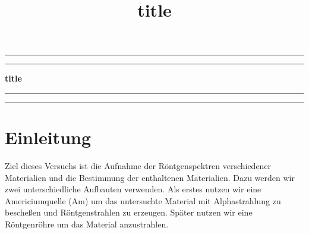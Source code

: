 \documentclass[a4paper,14pt]{article}
\title{\LARGE title}
\date{}
\newcommand{\Thickline}{\rule{\linewidth}{0.4mm}}
\newcommand{\Thinline}{\rule{\linewidth}{0.1mm}}
\newcommand{\skippage}{\clearpage{\thispagestyle{empty}\cleardoublepage}}
\begin{document}
	
\begin{titlepage}
	\thispagestyle{empty}
	
%
%
%
	
	\vspace{3cm}
	\begin{center}
		\Thickline
		\vskip -0.45cm
		\Thinline
		\vspace{0.5cm}
		
		\huge{ \textbf{ title } } 
		
		\Thinline
		\vskip -1cm
		\Thickline 
		\vspace{1cm}

		
	\end{center}
	\vfill
	
\end{titlepage}
	
	
	
\skippage
{}
\thispagestyle{plain}

\tableofcontents
\listoffigures

\begingroup
\let\cleardoublepage\relax
\let\clearpage\relax
\listoftables
\endgroup

\skippage

\setcounter{page}{1}
\restoregeometry
\thispagestyle{fancy}

\skippage
	
\section{Einleitung}
Ziel dieses Versuchs ist die Aufnahme der Röntgenspektren verschiedener Materialien und die Bestimmung der enthaltenen Materialien. Dazu werden wir zwei unterschiedliche Aufbauten verwenden. Als erstes nutzen wir eine Americiumquelle (Am) um das untersuchte Material mit Alphastrahlung zu bescheßen und Röntgenstrahlen zu erzeugen. Später nutzen wir eine Röntgenröhre um das Material anzustrahlen.
\end{document}
